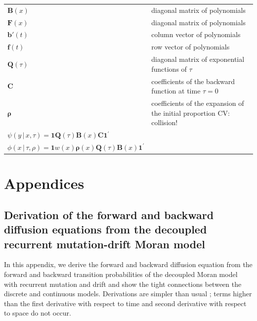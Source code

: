 \documentclass[preprint]{elsarticle}
\newcommand{\bs}[1]{\ensuremath{\boldsymbol{#1}}}
\newcommand\given{{\,|\,}}
\newcommand\y{\ensuremath{y}}
\begin{document}
\begin{table}[ht]
\begin{tabular}{l|l}
    $\mathbf{B}(x)$ &diagonal matrix of polynomials \\
    $\mathbf{F}(x)$ &diagonal matrix of polynomials \\
    $\bs{b}'(t)$ &column vector of polynomials \\
    $\bs{f}(t)$ &row vector of polynomials \\
    $\mathbf{Q}(\tau)$ &diagonal matrix of exponential functions of $\tau$\\
    $\mathbf{C}$ &coefficients of the backward function at time $\tau=0$\\
    $\mathbf{\rho}$ &coefficients of the expansion of the initial proportion {CV: collision!}\\
    $\psi(\y\given x,\tau)=\mathbf{1}\mathbf{Q}(\tau)\mathbf{B}(x)\mathbf{C}\mathbf{1}^{'}$\\
    $\phi(x\given\tau,\rho)=\mathbf{1}w(x)\mathbf{\rho}(x)\mathbf{Q}(\tau)\mathbf{B}(x)\mathbf{1}^{'}$\\
    \bottomrule
  \end{tabular}
\end{table}
\newpage

\section{Appendices}

\subsection{Derivation of the forward and backward diffusion equations from the decoupled recurrent mutation-drift Moran model}
\label{section:diffDer}

In this appendix, we derive the forward and backward diffusion equation from the forward and backward transition probabilities of the decoupled Moran model with recurrent mutation and drift and show the tight connections between the discrete and continuous models. Derivations are simpler than usual \citep{Ewen04}; terms higher than the first derivative with respect to time and second derivative with respect to space do not occur. 
\end{document}
